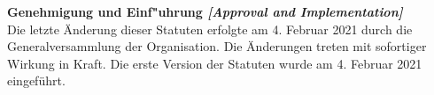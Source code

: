 \documentclass[10pt]{article}
\newcounter{qcounter}
\begin{document}
\begin{list}{{\bf Artikel :~}}{}
\item {\bf Genehmigung und Einf"uhrung {\it[Approval and Implementation]}}\\
Die letzte Änderung dieser Statuten erfolgte am 4. Februar 2021 durch die Generalversammlung der Organisation. Die Änderungen treten mit sofortiger Wirkung in Kraft. Die erste Version der Statuten wurde am 4. Februar 2021 eingeführt.\\

\end{list}


  
\end{document}

